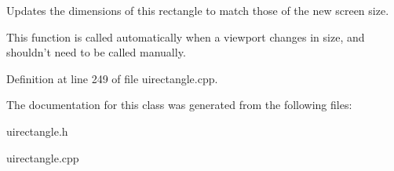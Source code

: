 Updates the dimensions of this rectangle to match those of the new screen size. 

This function is called automatically when a viewport changes in size, and shouldn't need to be called manually. 

Definition at line 249 of file uirectangle.cpp.



The documentation for this class was generated from the following files:\begin{DoxyCompactItemize}
\item 
uirectangle.h\item 
uirectangle.cpp\end{DoxyCompactItemize}
